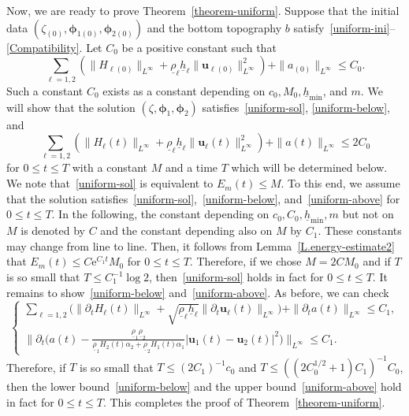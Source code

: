 \documentclass[11pt,leqno]{article}
\numberwithin{equation}{section}
\numberwithin{figure}{section}
\begin{document}
Now, we are ready to prove Theorem~\ref{theorem-uniform}. 
Suppose that the initial data $(\zeta_{(0)},\bm{\phi}_{1(0)},\bm{\phi}_{2(0)})$ and the bottom topography $b$ 
satisfy~\eqref{uniform-ini}--\eqref{Compatibility}. 
Let $C_0$ be a positive constant such that 
%
\[
\sum_{\ell=1,2}( \|H_{\ell(0)}\|_{L^\infty} + \underline{\rho}_\ell\underline{h}_\ell
  \|\bm{u}_{\ell(0)}\|_{L^\infty}^2 ) + \|a_{(0)}\|_{L^\infty} \leq C_0. 
\]
%
Such a constant $C_0$ exists as a constant depending on $c_0, M_0, \underline{h}_\mathrm{min}$, and $m$. 
We will show that the solution $(\zeta,\bm{\phi}_1,\bm{\phi}_2)$ satisfies~\eqref{uniform-sol}, 
\eqref{uniform-below}, and 
%
\begin{equation}\label{uniform-above}
\sum_{\ell=1,2}( \|H_{\ell}(t)\|_{L^\infty} + \underline{\rho}_\ell\underline{h}_\ell
  \|\bm{u}_{\ell}(t)\|_{L^\infty}^2 ) + \|a(t)\|_{L^\infty} \leq 2C_0
\end{equation}
%
for $0\leq t\leq T$ with a constant $M$ and a time $T$ which will be determined below. 
We note that~\eqref{uniform-sol} is equivalent to $E_m(t) \leq M$. 
To this end, we assume that the solution satisfies~\eqref{uniform-sol},~\eqref{uniform-below}, 
and~\eqref{uniform-above} for $0\leq t\leq T$. 
In the following, the constant depending on $c_0,C_0,\underline{h}_\mathrm{min},m$ but not on $M$ 
is denoted by $C$ and the constant depending also on $M$ by $C_1$. 
These constants may change from line to line. 
Then, it follows from Lemma~\ref{L.energy-estimate2} that $E_m(t)\leq C\mbox{e}^{C_1t}M_0$ for $0\leq t\leq T$. 
Therefore, if we chose $M=2CM_0$ and if $T$ is so small that $T \leq C_1^{-1}\log 2$, 
then~\eqref{uniform-sol} holds in fact for $0\leq t\leq T$. 
It remains to show~\eqref{uniform-below} and~\eqref{uniform-above}. 
As before, we can check 
%
\[
\begin{cases}
\sum_{\ell=1,2}\bigl( \|\partial_t H_\ell(t)\|_{L^\infty} + \sqrt{ \underline{\rho}_\ell\underline{h}_\ell }
  \|\partial_t\bm{u}_\ell(t)\|_{L^\infty} \bigr) + \|\partial_t a(t)\|_{L^\infty} \leq C_1, \\
\displaystyle
\|\partial_t \biggl( a(t)- \frac{\underline{\rho}_1\underline{\rho}_2}{
  \underline{\rho}_1 H_{2}(t)\alpha_2 + \underline{\rho}_2 H_1(t)\alpha_1 } |{\bm u}_1(t)-{\bm u}_2(t)|^2\biggr) \|_{L^\infty}
  \leq C_1.
\end{cases}
\]
%
Therefore, if $T$ is so small that $T\leq (2C_1)^{-1}c_0$ and $T\leq ((2C_0^{1/2}+1)C_1)^{-1}C_0$, 
then the lower bound~\eqref{uniform-below} and the upper bound~\eqref{uniform-above} hold in fact for $0\leq t\leq T$. 
This completes the proof of Theorem~\ref{theorem-uniform}. 
\end{document}
